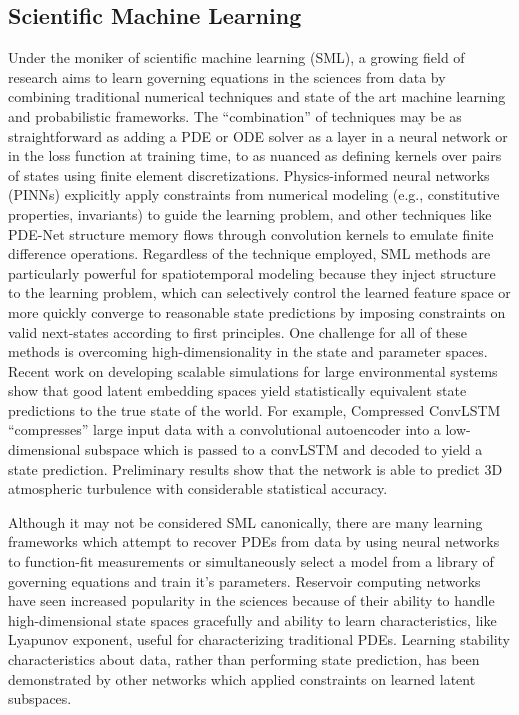 \subsection{Scientific Machine Learning}
Under the moniker of scientific machine learning (SML), a growing field of research aims to learn governing equations in the sciences from data by combining traditional numerical techniques and state of the art machine learning and probabilistic frameworks. The ``combination'' of techniques may be as straightforward as adding a PDE or ODE solver as a layer in a neural network\autocite{pakravan2020solving} or in the loss function at training time\autocite{raissi2019physics}, to as nuanced as defining kernels over pairs of states using finite element discretizations\autocite{raissi2018numerical}. Physics-informed neural networks (PINNs)\autocite{raissi2019physics,tartakovsky2018learning} explicitly apply constraints from numerical modeling (e.g., constitutive properties, invariants) to guide the learning problem, and other techniques like PDE-Net\autocite{long2017pde} structure memory flows through convolution kernels to emulate finite difference operations. Regardless of the technique employed, SML methods are particularly powerful for spatiotemporal modeling because they inject structure to the learning problem, which can selectively control the learned feature space or more quickly converge to reasonable state predictions by imposing constraints on valid next-states according to first principles. One challenge for all of these methods is overcoming high-dimensionality in the state and parameter spaces.
Recent work on developing scalable simulations for large environmental systems show that good latent embedding spaces yield statistically equivalent state predictions to the true state of the world\autocite{qian2020lift,mardt2020deep,baddoo2022kernel,baddoo2021physics}. For example, Compressed ConvLSTM\autocite{mohan2019compressed} ``compresses'' large input data with a convolutional autoencoder into a low-dimensional subspace which is passed to a convLSTM and decoded to yield a state prediction. Preliminary results show that the network is able to predict 3D atmospheric turbulence with considerable statistical accuracy. 

Although it may not be considered SML canonically, there are many learning frameworks which attempt to recover PDEs from data by using neural networks to function-fit measurements\autocite{berg2019data,kaiser2018sparse} or simultaneously select a model from a library of governing equations and train it's parameters\autocite{rudy2017data,sun2020neupde}. Reservoir computing networks have seen increased popularity in the sciences because of their ability to handle high-dimensional state spaces gracefully and ability to learn characteristics, like Lyapunov exponent, useful for characterizing traditional PDEs\autocite{pathak2017using}. Learning stability characteristics about data, rather than performing state prediction, has been demonstrated by other networks which applied constraints on learned latent subspaces\autocite{blanchard2019learning}.

